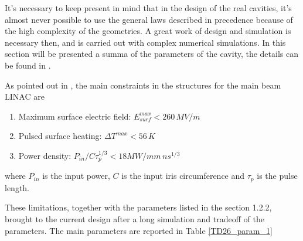 It's necessary to keep present in mind that in the design of the real cavities, it's almost never possible to use the general laws described in precedence because of the high complexity of the geometries. A great work of design and simulation is necessary then, and is carried out with complex numerical simulations. In this section will be presented a summa of the parameters of the cavity, the details can be found in \cite{CLIC:cdr,Grudiev:td26cc,Lunin:1333709}.

As pointed out in \cite{CLIC:cdr}, the main constraints in the structures for the main beam LINAC are 
\begin{enumerate}
\item Maximum surface electric field: $E_{surf}^{max} < 260 \, MV/m$
\item Pulsed surface heating: $\Delta T^{max} < 56 \,K$
\item Power density: $P_{in}/C\tau_p^{1/3} < 18 MW/mm \, ns^{1/3}$
\end{enumerate}
where $P_{in}$ is the input power, $C$ is the input iris circumference and $\tau_p$ is the pulse length.

These limitations, together with the parameters listed in the section 1.2.2, brought to the current design after a long simulation and tradeoff of the parameters. The main parameters are reported in Table \ref{TD26_param_1}

